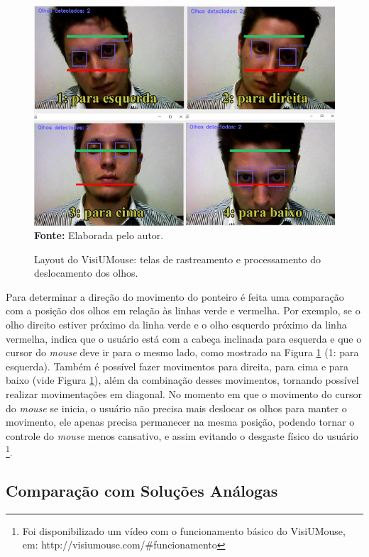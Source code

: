 \begin{figure}[htbp]
\caption{Layout do VisiUMouse: telas de rastreamento e processamento do deslocamento dos olhos.}
\centering \includegraphics[scale=1]{img/funcionamento2.png}
\textbf{Fonte:} Elaborada pelo autor.
\label{fig:funcionamento}
\end{figure}

Para determinar a direção do movimento do ponteiro é feita uma comparação com a posição dos olhos em relação às linhas verde e vermelha. Por exemplo, se o olho direito estiver próximo da linha verde e o olho esquerdo próximo da linha vermelha, indica que o usuário está com a cabeça inclinada para esquerda e que o cursor do \textit{mouse} deve ir para o mesmo lado, como mostrado na Figura \ref{fig:funcionamento} (1: para esquerda). Também é possível fazer movimentos para direita, para cima e para baixo (vide Figura \ref{fig:funcionamento}), além da combinação desses movimentos, tornando possível realizar movimentações em diagonal. No momento em que o movimento do cursor do \textit{mouse} se inicia, o usuário não precisa mais deslocar os olhos para manter o movimento, ele apenas precisa permanecer na mesma posição, podendo tornar o controle do \textit{mouse} menos cansativo, e assim evitando o desgaste físico do usuário \footnote{Foi disponibilizado um vídeo com o funcionamento básico do VisiUMouse, em: http://visiumouse.com/\#funcionamento}. 




\subsection{Comparação com Soluções Análogas}\label{Sub:tabela-comparativa}

